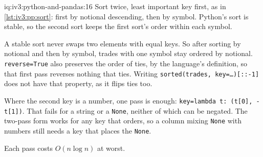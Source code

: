 \begin{solution}{iq:iv3:python-and-pandas:16}
Sort twice, least important key first, as in \cref{lst:iv3:pp:sort}: first by notional descending, then by symbol. Python's sort is stable, so the second sort keeps the first sort's order within each symbol.
\label{lst:iv3:pp:sort}

A stable sort never swaps two elements with equal keys. So after sorting by notional and then by symbol, trades with one symbol stay ordered by notional. \texttt{reverse=True} also preserves the order of ties, by the language's definition, so that first pass reverses nothing that ties. Writing \texttt{sorted(trades, key=\dots)[::-1]} does not have that property, as it flips ties too.

Where the second key is a number, one pass is enough: \texttt{key=lambda t: (t[0], -t[1])}. That fails for a string or a \texttt{None}, neither of which can be negated. The two-pass form works for any key that orders, so a column mixing \texttt{None} with numbers still needs a key that places the \texttt{None}.

Each pass costs $O(n \log n)$ at worst.

\end{solution}

